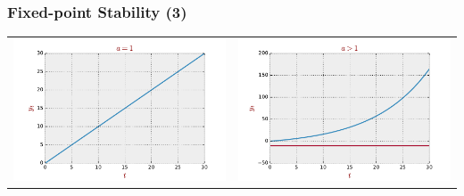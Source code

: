 \documentclass[10pt,usenames,dvipsnames]{beamer}
\theoremstyle{definition}
\begin{document}
\begin{frame}[fragile]
\frametitle{Fixed-point Stability (3)}
\begin{center}
	\begin{tabular}{cc}
		\includegraphics[scale=0.3]{./figs/fig5} & \includegraphics[scale=0.3]{./figs/fig6}
\end{tabular}

\end{center}
\end{frame}
\end{document}
